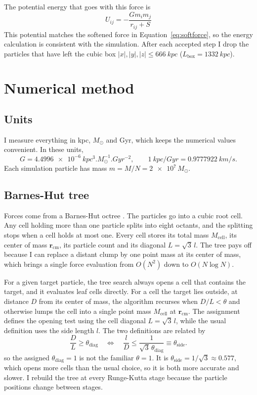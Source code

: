 \documentclass[12pt,a4paper]{article}
\begin{document}
The potential energy that goes with this force is
\begin{equation}
    U_{ij}=-\frac{Gm_im_j}{r_{ij}+S}
\end{equation}
This potential matches the softened force in Equation~\ref{eq:softforce}, so the energy calculation is consistent with the simulation. After each accepted step I drop the particles that have left the cubic box $|x|,|y|,|z| \le \SI{666}{kpc}$ ($L_{\mathrm{box}} = \SI{1332}{kpc}$).

\section{Numerical method}\label{sec:method}

\subsection{Units}

I measure everything in kpc, $M_\odot$ and Gyr, which keeps the numerical values convenient. In these units,
\begin{equation}
    G=\SI{4.4996e-6}{kpc^3.M_\odot^{-1}.Gyr^{-2}},
    \qquad \SI{1}{kpc/Gyr}=\SI{0.9777922}{km/s}.
\end{equation}
Each simulation particle has mass $m=M/N=\num{2e7}\,M_\odot$.

\subsection{Barnes-Hut tree}

Forces come from a Barnes-Hut octree \cite{barneshut}. The particles go into a cubic root cell. Any cell holding more than one particle splits into eight octants, and the splitting stops when a cell holds at most one. Every cell stores its total mass $M_{\mathrm{cell}}$, its center of mass $\mathbf{r}_{\mathrm{cm}}$, its particle count and its diagonal $L = \sqrt{3}\,l$. The tree pays off because I can replace a distant clump by one point mass at its center of mass, which brings a single force evaluation from $O(N^2)$ down to $O(N\log N)$.

For a given target particle, the tree search always opens a cell that contains the target, and it evaluates leaf cells directly. For a cell the target lies outside, at distance $D$ from its center of mass, the algorithm recurses when $D/L < \theta$ and otherwise lumps the cell into a single point mass $M_{\mathrm{cell}}$ at $\mathbf{r}_{\mathrm{cm}}$. The assignment defines the opening test using the cell diagonal $L = \sqrt{3}\,l$, while the usual definition uses the side length $l$. The two definitions are related by
\begin{equation}
    \frac{D}{L} \ge \theta_{\mathrm{diag}} \quad \Longleftrightarrow \quad \frac{l}{D} \le \frac{1}{\sqrt{3}\,\theta_{\mathrm{diag}}} \equiv \theta_{\mathrm{side}}.
\end{equation}
so the assigned $\theta_{\mathrm{diag}} = 1$ is not the familiar $\theta = 1$. It is $\theta_{\mathrm{side}} = 1/\sqrt{3} \approx 0.577$, which opens more cells than the usual choice, so it is both more accurate and slower. I rebuild the tree at every Runge-Kutta stage because the particle positions change between stages.
\end{document}
